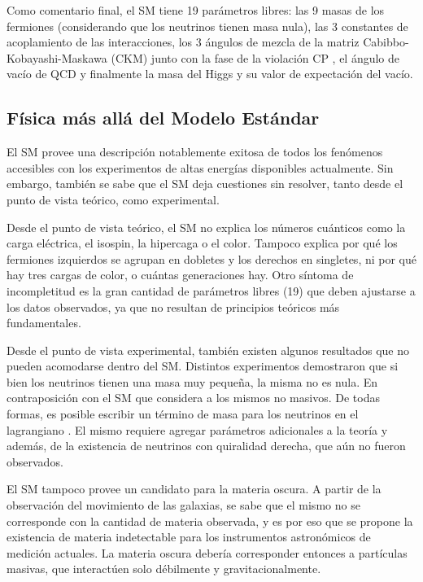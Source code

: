 Como comentario final, el SM tiene 19 parámetros libres: las 9 masas de los fermiones (considerando que los neutrinos tienen masa nula), las 3 constantes de acoplamiento de las interacciones, los 3 ángulos de mezcla de la matriz Cabibbo-Kobayashi-Maskawa (CKM) junto con la fase de la violación CP , el ángulo de vacío de QCD y finalmente la masa del Higgs y su valor de expectación del vacío.


\subsection{Física más allá del Modelo Estándar}

El SM provee una descripción notablemente exitosa de todos los fenómenos accesibles con los experimentos de altas energías disponibles actualmente. Sin embargo, también se sabe que el SM deja cuestiones sin resolver, tanto desde el punto de vista teórico, como experimental.

Desde el punto de vista teórico, el SM no explica los números cuánticos como la carga eléctrica, el isospin, la hipercaga o el color. Tampoco explica por qué los fermiones izquierdos se agrupan en dobletes y los derechos en singletes, ni por qué hay tres cargas de color, o cuántas generaciones hay. Otro síntoma de incompletitud es la gran cantidad de parámetros libres (19) que deben ajustarse a los datos observados, ya que no resultan de principios teóricos más fundamentales.

Desde el punto de vista experimental, también existen algunos resultados que no pueden acomodarse dentro del SM. Distintos experimentos demostraron que si bien los neutrinos tienen una masa muy pequeña, la misma no es nula. En contraposición con el SM que considera a los mismos no masivos. De todas formas, es posible escribir un término de masa para los neutrinos en el lagrangiano . El mismo requiere agregar parámetros adicionales a la teoría y además, de la existencia de neutrinos con quiralidad derecha, que aún no fueron observados.

El SM tampoco provee un candidato para la materia oscura. A partir de la observación del movimiento de las galaxias, se sabe que el mismo no se corresponde con la cantidad de materia observada, y es por eso que se propone la existencia de materia indetectable para los instrumentos astronómicos de medición actuales. La materia oscura debería corresponder entonces a partículas masivas, que interactúen solo débilmente y gravitacionalmente.

